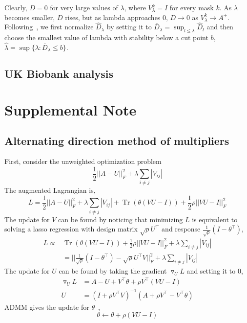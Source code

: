 \documentclass{article}
\DeclareMathOperator{\Tr}{Tr}
\newcommand{\beginsupplement}{%
        \setcounter{table}{0}
        \renewcommand{\thetable}{S\arabic{table}}%
        \setcounter{figure}{0}
        \renewcommand{\thefigure}{S\arabic{figure}}%
     }
\begin{document}
Clearly, $D = 0$ for very large values of $\lambda$, where $V^k_\lambda = I$
for every mask $k$. As $\lambda$ becomes smaller, $D$ rises, but as lambda approaches $0$,
$D\rightarrow 0$ as $V^k_\lambda \rightarrow A^+$. Following~\cite{Liu2010},
we first normalize $\hat{D}_\lambda$ by setting it to
$\bar{D}_\lambda = \sup_{l \leq \lambda} \hat{D}_l$ and then choose the smallest
value of lambda with stability below a cut point $b$,
$\hat{\lambda} = \sup \{ \lambda : \bar{D}_\lambda \leq b \}$.

\subsection{UK Biobank analysis}




\beginsupplement
\section*{Supplemental Note}
\subsection*{Alternating direction method of multipliers}\label{note}
First, consider the unweighted optimization problem
\begin{equation}
\frac{1}{2} ||A - U||_F^2 + \lambda \sum_{i\neq j}|V_{ij}|
\end{equation}
The augmented Lagrangian is,
\begin{equation*}
L = \frac{1}{2} ||A - U||_F^2 +
   \lambda \sum_{i\neq j}|V_{ij}| +
   \Tr(\theta(VU-I)) + 
   \frac{1}{2} \rho ||VU-I||_F^2
\end{equation*}
The update for $V$ can be found by noticing that minimizing $L$ is equivalent
to solving a lasso regression with design matrix $\sqrt{\rho} U^\top$ and
response $\frac{1}{\sqrt{\rho}}(I-\theta^\top)$,
\begin{align*}
   L \propto& \Tr(\theta(VU-I)) + 
     \frac{1}{2} \rho ||VU-I||_F^2 + \lambda \sum_{i\neq j}|V_{ij}| \\
   &= ||\frac{1}{\sqrt{\rho}}(I-\theta^\top) -
      \sqrt{\rho} U^\top V||_F^2 + \lambda \sum_{i\neq j}|V_{ij}|
\end{align*}
The update for $U$ can be found by taking the gradient $\triangledown_U L$
and setting it to 0,
\begin{align*}
\triangledown_U L &= A - U + V^\top \theta + \rho V^\top(VU-I) \\
U &= (I + \rho V^{\top} V)^{-1}(A + \rho V^\top - V^\top \theta)
\end{align*}
ADMM gives the update for $\theta$~\cite{Boyd2010},
\begin{equation}
\theta \leftarrow \theta + \rho(VU-I)
\end{equation}
\end{document}
